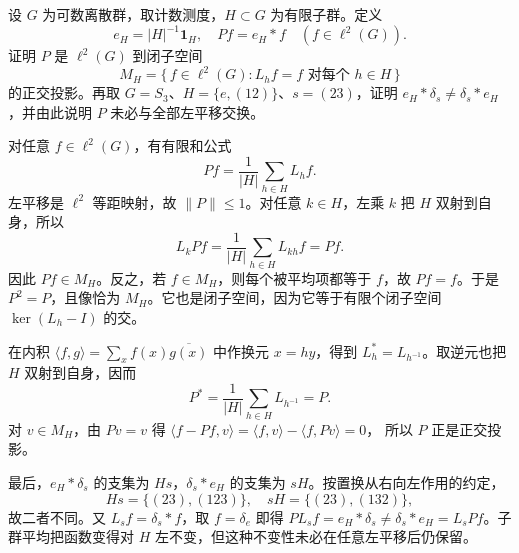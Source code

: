 \begin{exercise}[有限子群的平均投影]
\label{b2:ex:I2-subgroup-average}
设 \(G\) 为可数离散群，取计数测度，\(H\subset G\) 为有限子群。定义
\[
 e_H=|H|^{-1}\mathbf1_H,\quad
 Pf=e_H*f\quad(f\in\ell^2(G)).
\]
证明 \(P\) 是 \(\ell^2(G)\) 到闭子空间
\[
 M_H=\{\,f\in\ell^2(G):L_hf=f\text{ 对每个 }h\in H\,\}
\]
的正交投影。再取 \(G=S_3\)、\(H=\{e,(12)\}\)、\(s=(23)\)，证明 \(e_H*\delta_s\ne\delta_s*e_H\)，并由此说明 \(P\) 未必与全部左平移交换。
\end{exercise}
\begin{solution}
对任意 \(f\in\ell^2(G)\)，有有限和公式
\[
 Pf=\frac1{|H|}\sum_{h\in H}L_hf.
\]
左平移是 \(\ell^2\) 等距映射，故 \(\|P\|\le1\)。对任意 \(k\in H\)，左乘 \(k\) 把 \(H\) 双射到自身，所以
\[
 L_kPf=\frac1{|H|}\sum_{h\in H}L_{kh}f=Pf.
\]
因此 \(Pf\in M_H\)。反之，若 \(f\in M_H\)，则每个被平均项都等于 \(f\)，故 \(Pf=f\)。于是 \(P^2=P\)，且像恰为 \(M_H\)。它也是闭子空间，因为它等于有限个闭子空间 \(\ker(L_h-I)\) 的交。

在内积 \(\langle f,g\rangle=\sum_xf(x)\overline{g(x)}\) 中作换元 \(x=hy\)，得到 \(L_h^*=L_{h^{-1}}\)。取逆元也把 \(H\) 双射到自身，因而
\[
 P^*=\frac1{|H|}\sum_{h\in H}L_{h^{-1}}=P.
\]
对 \(v\in M_H\)，由 \(Pv=v\) 得
\(\langle f-Pf,v\rangle=\langle f,v\rangle-\langle f,Pv\rangle=0\)，
所以 \(P\) 正是正交投影。

最后，\(e_H*\delta_s\) 的支集为 \(Hs\)，\(\delta_s*e_H\) 的支集为 \(sH\)。按置换从右向左作用的约定，
\[
 Hs=\{(23),(123)\},\quad sH=\{(23),(132)\},
\]
故二者不同。又 \(L_sf=\delta_s*f\)，取 \(f=\delta_e\) 即得
\(PL_sf=e_H*\delta_s\ne\delta_s*e_H=L_sPf\)。子群平均把函数变得对 \(H\) 左不变，但这种不变性未必在任意左平移后仍保留。
\end{solution}

